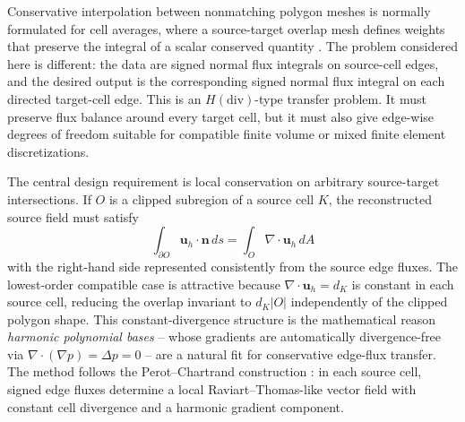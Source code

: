 \documentclass[11pt]{article}
\newcommand{\uh}{\mathbf{u}_h}
\newcommand{\n}{\mathbf{n}}
\begin{document}
Conservative interpolation between nonmatching polygon meshes is normally
formulated for cell averages, where a source-target overlap mesh defines
weights that preserve the integral of a scalar conserved quantity
\cite{DukowiczKodis1987,Jones1999,UllrichTaylor2015}.  The problem considered
here is different: the data are signed normal flux integrals on source-cell
edges, and the desired output is the corresponding signed normal flux integral
on each directed target-cell edge.  This is an $H(\mathrm{div})$-type transfer
problem.  It must preserve flux balance around every target cell, but it must
also give edge-wise degrees of freedom suitable for compatible finite volume or
mixed finite element discretizations.

The central design requirement is local conservation on arbitrary source-target
intersections.  If \(O\) is a clipped subregion of a source cell \(K\), the
reconstructed source field must satisfy
\[
  \int_{\partial O}\uh\cdot\n\,ds = \int_O \nabla\cdot\uh\,dA
\]
with the right-hand side represented consistently from the source edge fluxes.
The lowest-order compatible case is attractive because
$\nabla\cdot\uh=d_K$ is constant in each source cell, reducing the overlap
invariant to $d_K |O|$ independently of the clipped polygon shape.  This
constant-divergence structure is the mathematical reason \emph{harmonic
polynomial bases} -- whose gradients are automatically divergence-free via
$\nabla\cdot(\nabla p) = \Delta p = 0$ -- are a natural fit for conservative
edge-flux transfer.  The method follows the Perot--Chartrand construction
\cite{PerotChartrand2021}: in each source cell, signed edge fluxes determine a
local Raviart--Thomas-like vector field with constant cell divergence and a
harmonic gradient component.
\end{document}
